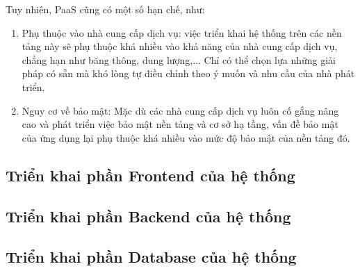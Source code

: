 Tuy nhiên, PaaS cũng có một số hạn chế, như:
\begin{enumerate}
    \item Phụ thuộc vào nhà cung cấp dịch vụ: việc triển khai hệ thống trên các nền tảng này sẽ phụ thuộc khá nhiều vào khả năng của nhà cung cấp dịch vụ, chẳng hạn như băng thông, dung lượng,... Chỉ có thể chọn lựa những giải pháp có sẵn mà khó lòng tự điều chỉnh theo ý muốn và nhu cầu của nhà phát triển.
    \item Nguy cơ về bảo mật: Mặc dù các nhà cung cấp dịch vụ luôn cố gắng nâng cao và phát triển việc bảo mật nền tảng và cơ sở hạ tầng, vấn đề bảo mật của ứng dụng lại phụ thuộc khá nhiều vào mức độ bảo mật của nền tảng đó.
\end{enumerate}

\subsection{Triển khai phần Frontend của hệ thống}
\subsection{Triển khai phần Backend của hệ thống}

\subsection{Triển khai phần Database của hệ thống}

